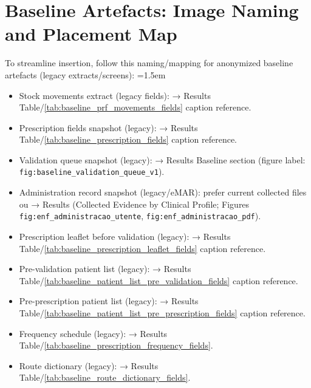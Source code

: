 \section{Baseline Artefacts: Image Naming and Placement Map}
To streamline insertion, follow this naming/mapping for anonymized baseline artefacts (legacy extracts/screens):
\begingroup\emergencystretch=1.5em\small
\begin{itemize}
    \item Stock movements extract (legacy fields): \texttt{} → Results Table/\ref{tab:baseline_prf_movements_fields} caption reference.
    \item Prescription fields snapshot (legacy): \texttt{} → Results Table/\ref{tab:baseline_prescription_fields} caption reference.
    \item Validation queue snapshot (legacy): \texttt{} → Results Baseline section (figure label: \texttt{fig:baseline\_validation\_queue\_v1}).
    \item Administration record snapshot (legacy/eMAR): prefer current collected files \texttt{} ou \texttt{} → Results (Collected Evidence by Clinical Profile; Figures \texttt{fig:enf\_administracao\_utente}, \texttt{fig:enf\_administracao\_pdf}).
    \item Prescription leaflet before validation (legacy): \texttt{} → Results Table/\ref{tab:baseline_prescription_leaflet_fields} caption reference.
    \item Pre-validation patient list (legacy): \texttt{} → Results Table/\ref{tab:baseline_patient_list_pre_validation_fields} caption reference.
    \item Pre-prescription patient list (legacy): \texttt{} → Results Table/\ref{tab:baseline_patient_list_pre_prescription_fields} caption reference.
    \item Frequency schedule (legacy): \texttt{} → Results Table/\ref{tab:baseline_prescription_frequency_fields}.
    \item Route dictionary (legacy): \texttt{} → Results Table/\ref{tab:baseline_route_dictionary_fields}.

\end{itemize}

